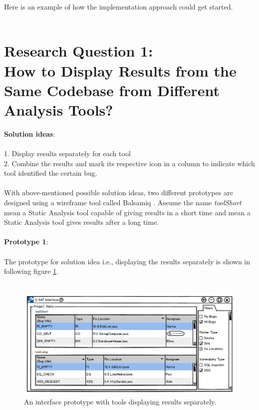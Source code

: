 Here is an example of how the implementation approach could get started. \\ \\

\section{Research Question 1: \\ How to Display Results from the Same Codebase from Different Analysis Tools?} 


\textbf{Solution ideas}: \\ \\
1. Display results separately for each tool \\
2. Combine the results and mark its respective icon in a column to indicate which tool identified the certain bug. \\ \\

With above-mentioned possible solution ideas, two different prototypes are designed using a wireframe tool called Balsamiq \cite{B}. Assume the name \textit{toolShort} mean a Static Analysis tool capable of giving results in a short time and  mean a Static Analysis tool gives results after a long time. \\ \\

\textbf{Prototype 1}: \\ \\

The prototype for solution idea i.e., displaying the results separately is shown in following figure \ref{fig:toolSeperate}. \\ \\

\begin{figure}[hbt!]
	\centering
	\includegraphics[width=\linewidth]{figures/d_seperate}
	\caption{An interface prototype with tools displaying results separately.}
	\label{fig:toolSeperate}
\end{figure}
\newpage

